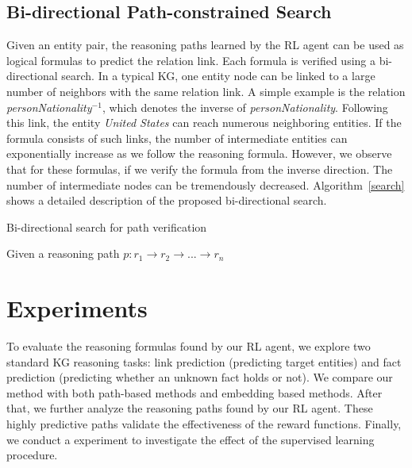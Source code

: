 \documentclass[11pt,letterpaper]{article}
\begin{document}
\subsection{Bi-directional Path-constrained Search}
Given an entity pair, the reasoning paths learned by the RL agent can be used as logical formulas to predict the relation link. Each formula is verified using a bi-directional search. In a typical KG, one entity node can be linked to a large number of neighbors with the same relation link. A simple example is the relation \textit{personNationality}$^{-1}$, which denotes the inverse of \textit{personNationality}. Following this link, the entity \textit{United States} can reach numerous neighboring entities. If the formula consists of such links, the number of intermediate entities can exponentially increase as we follow the reasoning formula. However, we observe that for these formulas, if we verify the formula from the inverse direction. The number of intermediate nodes can be tremendously decreased. Algorithm~\ref{search} shows a detailed description of the proposed bi-directional search.
\begin{algorithm}[t]
\caption{Bi-directional search for path verification}\label{search}
Given a reasoning path $p:{r_1 \rightarrow r_2 \rightarrow ... \rightarrow r_n}$\\
\end{algorithm}

\section{Experiments}
\label{sec:exp}
To evaluate the reasoning formulas found by our RL agent, we explore two standard KG reasoning tasks:  link prediction (predicting target entities) and fact prediction (predicting whether an unknown fact holds or not). We compare our method with both path-based methods and embedding based methods. After that, we further analyze the reasoning paths found by our RL agent. These highly predictive paths validate the effectiveness of the reward functions. Finally, we conduct a experiment to investigate the effect of the supervised learning procedure.
\end{document}
